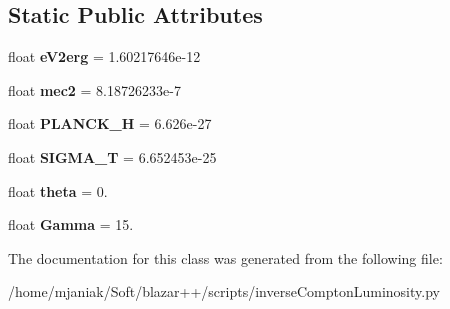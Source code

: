 \subsection*{Static Public Attributes}
\begin{DoxyCompactItemize}
\item 
\hypertarget{classinverseComptonLuminosity_1_1calculator_a13c3533e0e6eff1b1feb38a03921c290}{float {\bfseries e\-V2erg} = 1.\-60217646e-\/12}\label{classinverseComptonLuminosity_1_1calculator_a13c3533e0e6eff1b1feb38a03921c290}

\item 
\hypertarget{classinverseComptonLuminosity_1_1calculator_a167dcc8b4da3df41b9f11ac2fb4aa91a}{float {\bfseries mec2} = 8.\-18726233e-\/7}\label{classinverseComptonLuminosity_1_1calculator_a167dcc8b4da3df41b9f11ac2fb4aa91a}

\item 
\hypertarget{classinverseComptonLuminosity_1_1calculator_afdd91df0d2f39ee3e04be50c00017596}{float {\bfseries P\-L\-A\-N\-C\-K\-\_\-\-H} = 6.\-626e-\/27}\label{classinverseComptonLuminosity_1_1calculator_afdd91df0d2f39ee3e04be50c00017596}

\item 
\hypertarget{classinverseComptonLuminosity_1_1calculator_ac2417e69fd8539cb2efc7d165c5279a3}{float {\bfseries S\-I\-G\-M\-A\-\_\-\-T} = 6.\-652453e-\/25}\label{classinverseComptonLuminosity_1_1calculator_ac2417e69fd8539cb2efc7d165c5279a3}

\item 
\hypertarget{classinverseComptonLuminosity_1_1calculator_a5987b69feac1eb001a3bf3238509b69d}{float {\bfseries theta} = 0.}\label{classinverseComptonLuminosity_1_1calculator_a5987b69feac1eb001a3bf3238509b69d}

\item 
\hypertarget{classinverseComptonLuminosity_1_1calculator_a208d2025b660f1caea07d46060454807}{float {\bfseries Gamma} = 15.}\label{classinverseComptonLuminosity_1_1calculator_a208d2025b660f1caea07d46060454807}

\end{DoxyCompactItemize}


The documentation for this class was generated from the following file\-:\begin{DoxyCompactItemize}
\item 
/home/mjaniak/\-Soft/blazar++/scripts/inverse\-Compton\-Luminosity.\-py\end{DoxyCompactItemize}
